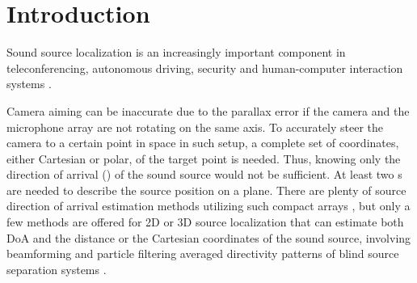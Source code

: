 \documentclass[applsci,article,submit,moreauthors,pdftex]{Definitions/mdpi}
\begin{document}


\section{Introduction}
Sound source localization is an increasingly important component in teleconferencing, autonomous driving, security and human-computer interaction systems \cite{martiSpeakerLocalizationDetection2011,lopatka_detection_2016,valinLocalizationSimultaneousMoving2004}.

Camera aiming can be inaccurate due to the parallax error if the camera and the microphone array are not rotating on the same axis. To accurately steer the camera to a certain point in space in such setup, a complete set of coordinates, either Cartesian or polar, of the target point is needed.
Thus, knowing only the direction of arrival (\doa{}) of the sound source would not be sufficient. At least two \doa{}s are needed to describe the source position on a plane.
There are plenty of source direction of arrival estimation methods utilizing such compact arrays \cite{bruttiComparisonDifferentSound2008,wengThreedimensionalSoundLocalization2001,awad-allaTwostageApproachPassive2020}, but only a few methods are offered for 2D or 3D source localization that can estimate both DoA and the distance or the Cartesian coordinates of the sound source, involving  
beamforming and particle filtering \cite{valinRobust3DLocalization2006}
averaged directivity patterns of blind source separation systems \cite{4959563}.
\end{document}
